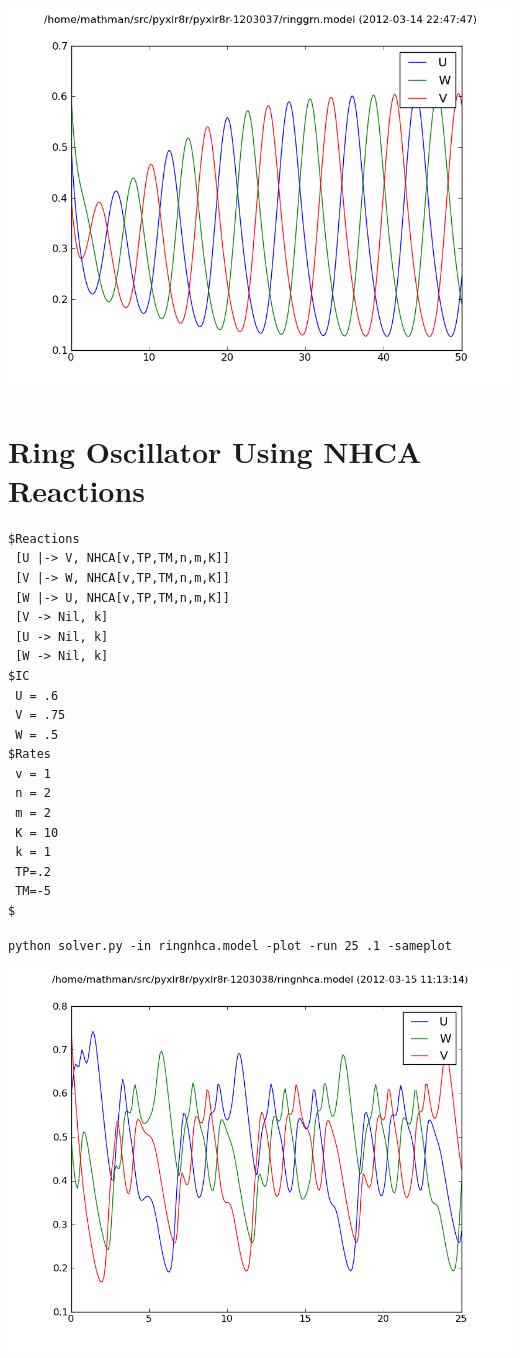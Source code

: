 \begin{center}
\includegraphics[width=.7\textwidth]{ringgrn.png}
\end{center}

\pagebreak

\section[Ring Oscillator (NHCA)]{Ring Oscillator Using NHCA Reactions}

\begin{changemargin}{1.5in}{1in}
\begin{scriptsize}
\begin{Verbatim}[frame=single,xrightmargin=\leftmargin]
$Reactions
 [U |-> V, NHCA[v,TP,TM,n,m,K]]
 [V |-> W, NHCA[v,TP,TM,n,m,K]]
 [W |-> U, NHCA[v,TP,TM,n,m,K]]
 [V -> Nil, k]
 [U -> Nil, k]
 [W -> Nil, k]
$IC
 U = .6
 V = .75
 W = .5
$Rates
 v = 1
 n = 2
 m = 2
 K = 10
 k = 1
 TP=.2
 TM=-5
$
\end{Verbatim}
\end{scriptsize}
\end{changemargin}

\begin{center}
{\tt  python solver.py -in ringnhca.model -plot -run 25 .1 -sameplot}
\end{center}

\begin{center}
\includegraphics[width=.7\textwidth]{ringnhca.png}
\end{center}

